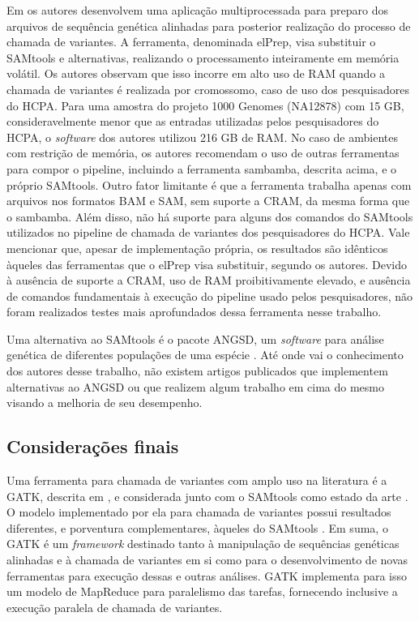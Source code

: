 \documentclass[cic,tc]{iiufrgs}
\begin{document}
Em \cite{herzeel2015elprep} os autores desenvolvem uma aplicação
multiprocessada para preparo dos arquivos de sequência genética alinhadas para
posterior realização do processo de chamada de variantes. A ferramenta,
denominada elPrep, visa substituir o SAMtools e alternativas, realizando o
processamento inteiramente em memória volátil. Os autores observam que isso
incorre em alto uso de RAM quando a chamada de variantes é realizada por
cromossomo, caso de uso dos pesquisadores do HCPA. Para uma amostra do projeto
1000 Genomes (NA12878) com 15 GB, consideravelmente menor que as entradas
utilizadas pelos pesquisadores do HCPA, o \textit{software} dos autores utilizou 216 GB
de RAM. No caso de ambientes com restrição de memória, os autores recomendam o
uso de outras ferramentas para compor o pipeline, incluindo a ferramenta
sambamba, descrita acima, e o próprio SAMtools. Outro fator limitante é que a
ferramenta trabalha apenas com arquivos nos formatos BAM e SAM, sem suporte a
CRAM, da mesma forma que o sambamba. Além disso, não há suporte para alguns dos
comandos do SAMtools utilizados no pipeline de chamada de variantes dos
pesquisadores do HCPA. Vale mencionar que, apesar de implementação própria, os
resultados são idênticos àqueles das ferramentas que o elPrep visa substituir,
segundo os autores. Devido à ausência de suporte a CRAM, uso de RAM
proibitivamente elevado, e ausência de comandos fundamentais à execução do
pipeline usado pelos pesquisadores, não foram realizados testes mais
aprofundados dessa ferramenta nesse trabalho.

Uma alternativa ao SAMtools é o pacote ANGSD, um \textit{software} para análise genética
de diferentes populações de uma espécie \cite{korneliussen2014angsd}. Até onde
vai o conhecimento dos autores desse trabalho, não existem artigos publicados
que implementem alternativas ao ANGSD ou que realizem algum trabalho em cima do
mesmo visando a melhoria de seu desempenho.

\subsection{Considerações finais}
\label{sec:alt}

Uma ferramenta para chamada de variantes com amplo uso na literatura
\cite{de2017gatk} é a GATK, descrita em \cite{mckenna2010genome}, e considerada
junto com o SAMtools como estado da
arte \cite{yao2020evaluation} \cite{poplin2018universal}. O modelo implementado
por ela para chamada de variantes possui resultados diferentes, e porventura
complementares, àqueles do
SAMtools \cite{gezsi2015variantmetacaller} \cite{hwang2015systematic}. Em suma, o
GATK é um \textit{framework} destinado tanto à manipulação de sequências genéticas
alinhadas e à chamada de variantes em si como para o desenvolvimento de novas
ferramentas para execução dessas e outras análises. GATK implementa para isso
um modelo de MapReduce para paralelismo das tarefas, fornecendo inclusive a
execução paralela de chamada de variantes.
\end{document}
